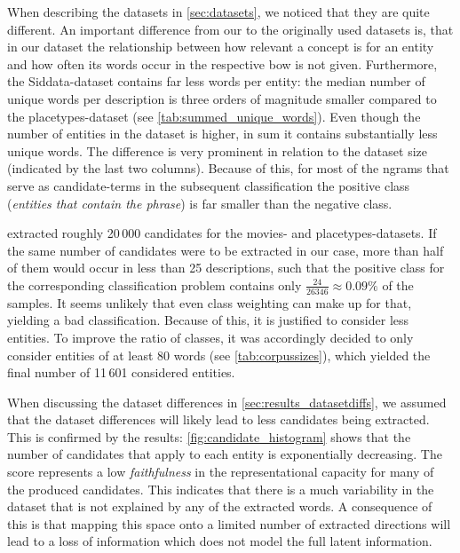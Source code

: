 When describing the datasets in \autoref{sec:datasets}, we noticed that they are quite different. An important difference from our to the originally used datasets is, that in our dataset the relationship between how relevant a concept is for an entity and how often its words occur in the respective \gls{bow} is not given. Furthermore, the Siddata-dataset contains far less words per entity: the median number of unique words per description is three orders of magnitude smaller compared to the placetypes-dataset (see \autoref{tab:summed_unique_words}). Even though the number of entities in the dataset is higher, in sum it contains substantially less unique words. The difference is very prominent in relation to the dataset size (indicated by the last two columns). Because of this, for most of the \glspl{ngram} that serve as candidate-terms in the subsequent classification the positive class (\textit{entities that contain the phrase}) is far smaller than the negative class. 

\textcite{Derrac2015} extracted roughly 20\,000 candidates for the movies- and placetypes-datasets. If the same number of candidates were to be extracted in our case, more than half of them would occur in less than 25 descriptions, such that the positive class for the corresponding classification problem contains only $\frac{24}{26346} \approx 0.09\%$ of the samples. It seems unlikely that even class weighting can make up for that, yielding a bad classification. Because of this, it is justified to consider less entities. To improve the ratio of classes, it was accordingly decided to only consider entities of at least 80 words (see \autoref{tab:corpussizes}), which yielded the final number of 11\,601 considered entities. 

When discussing the dataset differences in \autoref{sec:results_datasetdiffs}, we assumed that the dataset differences will likely lead to less candidates being extracted. This is confirmed by the results: \autoref{fig:candidate_histogram} shows that the number of candidates that apply to each entity is exponentially decreasing. The score represents a low \textit{faithfulness} in the representational capacity for many of the produced candidates. This indicates that there is a much variability in the dataset that is not explained by any of the extracted words. A consequence of this is that mapping this space onto a limited number of extracted directions will lead to a loss of information which does not model the full latent information.

